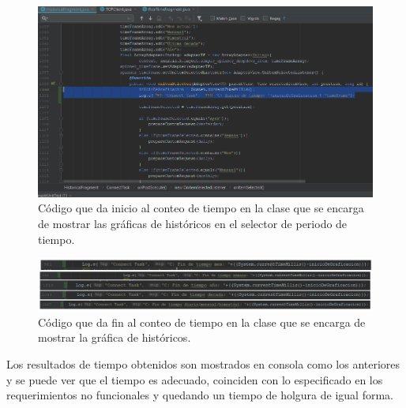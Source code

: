 \begin{figure}[H]
	\centering
	\includegraphics[scale=.6]{Capitulo5/images/TiempoCompletoCodigoInicioH2.png}
	\caption{Código que da inicio al conteo de tiempo en la clase que se encarga de mostrar las gráficas de históricos en el selector de periodo de tiempo.}	\label{fig:TiempoCompletoHInicio2}
\end{figure} 

\begin{figure}[H]
	\centering
	\includegraphics[scale=.6]{Capitulo5/images/TiempoCompletoCodigoFinH.png}
	\caption{Código que da fin al conteo de tiempo en la clase que se encarga de mostrar la gráfica de históricos.}	\label{fig:TiempoCompletoHFin}
\end{figure} 

Los resultados de tiempo obtenidos son mostrados en consola como los anteriores y se puede ver que el tiempo es adecuado, coinciden con lo especificado en los requerimientos no funcionales y quedando un tiempo de holgura de igual forma.\\ \newline


